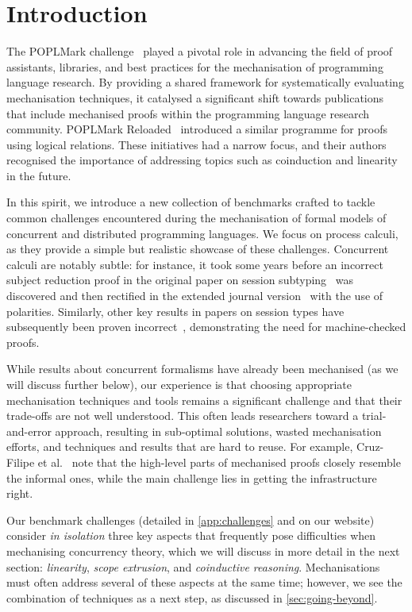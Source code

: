\documentclass[runningheads]{llncs}
\begin{document}
\section{Introduction}
The POPLMark challenge~\cite{POPLMark}
played a pivotal role in advancing the field of proof assistants,
libraries, and best practices for the mechanisation of programming language research. By providing a shared framework for systematically
evaluating mechanisation techniques, it catalysed a significant
shift towards publications that include mechanised proofs within the programming language research community.
POPLMark Reloaded~\cite{POPLMarkReloaded} introduced a similar programme for proofs using logical relations.
These initiatives had a narrow focus, and their authors recognised the importance of addressing topics such as coinduction and linearity in the future.

In this spirit, we introduce a new collection of benchmarks 
crafted to tackle common challenges encountered during
the mechanisation of formal models of concurrent and distributed
programming languages.  We focus on process calculi, as
they provide a simple but realistic showcase of these challenges.  Concurrent calculi are
notably subtle: for instance, it took some years before an incorrect
subject reduction proof in the original paper on session
subtyping~\cite{GH99} was discovered and then rectified in the extended journal version~\cite{GH05} with the use of
polarities.
Similarly, other key results in papers on session types have subsequently
been proven incorrect~\cite{Gay2020,10.1145/3290343}, demonstrating the
need for machine-checked proofs.

While results about concurrent
formalisms have already been mechanised (as we will discuss further
below), our experience is that choosing appropriate mechanisation
techniques and tools remains a significant challenge and that their
trade-offs are not well understood.  This often leads researchers
toward a trial-and-error approach, resulting in sub-optimal solutions,
wasted mechanisation efforts, and techniques and results that are hard
to reuse. For example, Cruz-Filipe et al.~\cite{Cruz-Filipe2021b} note that the high-level parts of
mechanised proofs closely resemble the informal ones, while the
main challenge lies in getting the infrastructure right.

Our benchmark challenges (detailed in \cref{app:challenges} and on our website) consider
\emph{in isolation} three key aspects that frequently pose difficulties
when mechanising concurrency theory, which we will discuss in more detail in the next section: \emph{linearity}, \emph{scope
  extrusion}, and \emph{coinductive reasoning}.
Mechanisations must often address several of these aspects at the same time; however, we
see the combination of techniques as a next
step, as discussed in \cref{sec:going-beyond}.
\end{document}
